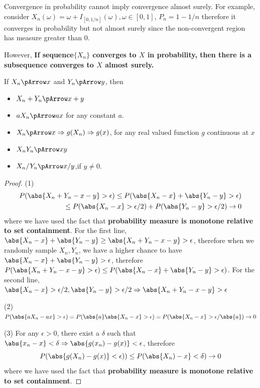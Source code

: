 \begin{refsection}
\begin{remark}
 Convergence in probability cannot imply convergence almost surely. For example, consider $X_n(\omega)=\omega + I_{[0,1/n]}(\omega),\omega \in [0,1]$, $P_n = 1-1/n$ therefore it converges in probability but not almost surely since the non-convergent region has measure greater than 0.

However, \textbf{If sequence$\{X_n\}$ converges to $X$ in probability, then there is a subsequence converges to $X$ almost surely. }
\end{remark}





\begin{lemma}
If $X_n \pArrow x$ and $Y_n \pArrow y$, then
\begin{itemize}
    \item $X_n+Y_n \pArrow x + y$
    \item $aX_n \pArrow ax$ for any constant $a$.
    \item $X_n \pArrow x \Rightarrow g(X_n) \Rightarrow g(x)$, for any real valued function $g$ continuous at $x$
    \item $X_nY_n \pArrow xy$
    \item $X_n/Y_n \pArrow x/y$,if $y\neq 0$.
\end{itemize}
\end{lemma}
\begin{proof}
	(1) \cite[297]{hoggintroduction}
	\begin{align*}
	P(\abs{X_n+Y_n-x-y} > \epsilon) \leq P(\abs{X_n-x}+\abs{Y_n-y} > \epsilon) \\ 
	\leq P(\abs{X_n-x} > \epsilon/2) + P(\abs{Y_n-y} > \epsilon/2) \to 0
	\end{align*}
	where we have used the fact that \textbf{probability measure is monotone relative to set containment}. For the first line, $\abs{X_n-x}+\abs{Y_n-y} \geq \abs{X_n+Y_n-x-y} >\epsilon$, therefore when we randomly sample $X_n,Y_n$, we have a higher chance to have $\abs{X_n-x}+\abs{Y_n-y} > \epsilon$, therefore $P(\abs{X_n+Y_n-x-y} > \epsilon) \leq P(\abs{X_n-x}+\abs{Y_n-y} > \epsilon)$. For the second line,  $\abs{X_n-x} > \epsilon/2 ,\abs{Y_n-y} > \epsilon/2 \Rightarrow \abs{X_n+Y_n-x-y} > \epsilon$
	
	(2) $P(\abs{aX_n-ax} > \epsilon) =P(\abs{a}\abs{X_n-x} >\epsilon) = P(\abs{X_n-x} >\epsilon/\abs{a}) \to 0$
	
	(3) For any $\epsilon > 0$, there exist a $\delta$ such that $\abs{x_n - x} <\delta \Rightarrow \abs{g(x_n)-g(x)} < \epsilon$, therefore
	$$P(\abs{g(X_n)-g(x)} < \epsilon)) \leq P(\abs{X_n) - x} < \delta) \to 0$$
	where we have used the fact that \textbf{probability measure is monotone relative to set containment}. 
	

\end{proof}
\end{refsection}

